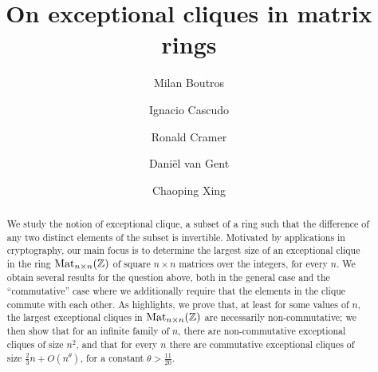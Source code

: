 \documentclass{amsart}
\title
[On exceptional cliques in matrix rings]
{On exceptional cliques in matrix rings}
\author[Milan Boutros]{Milan Boutros}
\author[Ignacio Cascudo]{Ignacio Cascudo} %
\author{Ronald Cramer} %
\author{Dani\"el van Gent} %
\author[Chaoping Xing]{Chaoping Xing} %
\theoremstyle{plain}
\theoremstyle{definition}
\newcommand{\Z}{\ensuremath{\mathbb{Z}}}
\begin{document}

\begin{abstract}
	We study the notion of exceptional clique, a subset of a ring such that the difference of any two distinct elements of the subset is invertible. Motivated by applications in cryptography, our main focus is to determine the largest size of an exceptional clique in the ring $\textup{Mat}_{n\times n}(\Z)$ of square $n\times n$ matrices over the integers, for every $n$.
	We obtain several results for the question above, both in the general case and the ``commutative'' case where we additionally require that the elements in the clique commute with each other. As highlights, we prove that, at least for some values of $n$, the largest exceptional cliques in $\textup{Mat}_{n\times n}(\Z)$ are necessarily non-commutative; we then show that for an infinite family of $n$, there are non-commutative exceptional cliques of size $n^2$, and that for every $n$ there are commutative exceptional cliques of size $\frac23 n+O(n^{\theta})$, for a constant $\theta>\frac{11}{20}$.
\end{abstract}	

\maketitle

\end{document}
